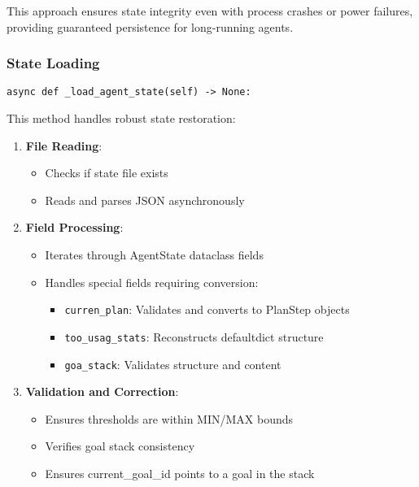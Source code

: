 \documentclass[12pt,a4paper]{article}
\newcommand{\code}[1]{\texttt{#1}}
\begin{document}
This approach ensures state integrity even with process crashes or power failures, providing guaranteed persistence for long-running agents.

\subsubsection*{State Loading}
\begin{pageablecode}
\begin{verbatim}
async def _load_agent_state(self) -> None:
\end{verbatim}
\end{pageablecode}
This method handles robust state restoration:

\begin{enumerate}[label=\arabic*.]
    \item \textbf{File Reading}:
    \begin{itemize}
        \item Checks if state file exists
        \item Reads and parses JSON asynchronously
    \end{itemize}
    \item \textbf{Field Processing}:
    \begin{itemize}
        \item Iterates through AgentState dataclass fields
        \item Handles special fields requiring conversion:
        \begin{itemize}
            \item \code{curren\1\_plan}: Validates and converts to PlanStep objects
            \item \code{too\1\_usag\1\_stats}: Reconstructs defaultdict structure
            \item \code{goa\1\_stack}: Validates structure and content
        \end{itemize}
    \end{itemize}
    \item \textbf{Validation and Correction}:
    \begin{itemize}
        \item Ensures thresholds are within MIN/MAX bounds
        \item Verifies goal stack consistency
        \item Ensures current\_goal\_id points to a goal in the stack

\end{itemize}
\end{enumerate}
\end{document}
